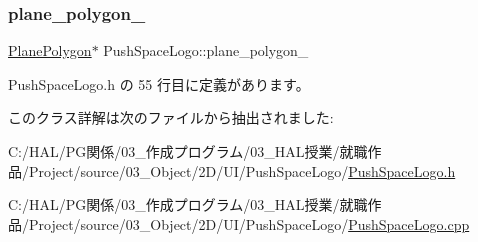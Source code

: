 \subsubsection{\texorpdfstring{plane\+\_\+polygon\+\_\+}{plane\_polygon\_}}
{\footnotesize\ttfamily \mbox{\hyperlink{class_plane_polygon}{Plane\+Polygon}}$\ast$ Push\+Space\+Logo\+::plane\+\_\+polygon\+\_\+}



 Push\+Space\+Logo.\+h の 55 行目に定義があります。



このクラス詳解は次のファイルから抽出されました\+:\begin{DoxyCompactItemize}
\item 
C\+:/\+H\+A\+L/\+P\+G関係/03\+\_\+作成プログラム/03\+\_\+\+H\+A\+L授業/就職作品/\+Project/source/03\+\_\+\+Object/2\+D/\+U\+I/\+Push\+Space\+Logo/\mbox{\hyperlink{_push_space_logo_8h}{Push\+Space\+Logo.\+h}}\item 
C\+:/\+H\+A\+L/\+P\+G関係/03\+\_\+作成プログラム/03\+\_\+\+H\+A\+L授業/就職作品/\+Project/source/03\+\_\+\+Object/2\+D/\+U\+I/\+Push\+Space\+Logo/\mbox{\hyperlink{_push_space_logo_8cpp}{Push\+Space\+Logo.\+cpp}}\end{DoxyCompactItemize}
